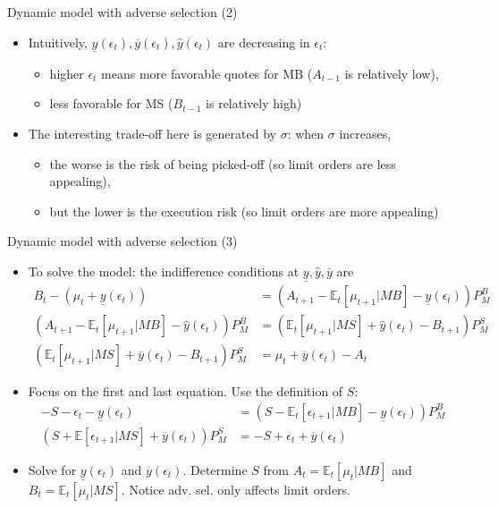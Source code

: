 \documentclass[english,10pt
,aspectratio=169
]{beamer}
\begin{document}
\begin{frame}{Dynamic model with adverse selection (2)}
	\begin{itemize}
		\item Intuitively, $\underline{y}(\epsilon_t),\overline{y}(\epsilon_t),\hat{y}(\epsilon_t)$ are decreasing in $\epsilon_t$:
		\begin{itemize}
			\item higher $\epsilon_t$ means more favorable quotes for MB ($A_{t-1}$ is relatively low), 
			\item less favorable for MS ($B_{t-1}$ is relatively high)
		\end{itemize}
		\item The interesting trade-off here is generated by $\sigma$: when $\sigma$ increases,
		\begin{itemize}
			\item the worse is the risk of being picked-off (so limit orders are less appealing),
			\item but the lower is the execution risk (so limit orders are more appealing)
		\end{itemize}
	\end{itemize}
\end{frame}


\begin{frame}{Dynamic model with adverse selection (3)}
	\begin{itemize}
		\item To solve the model: the indifference conditions at $\underline{y},\hat{y},\bar{y}$ are
		\begin{align*}
		B_t-(\mu_t+\underline{y}(\epsilon_t)) 					& = (A_{t+1}-\mathbb{E}_t[\mu_{t+1}|MB]-\underline{y}(\epsilon_t) 	)P^B_M \\
		(A_{t+1}-\mathbb{E}_t[\mu_{t+1}|MB]-\hat{y}(\epsilon_t))P^B_M 			& = (\mathbb{E}_t[\mu_{t+1}|MS]+\hat{y}(\epsilon_t)-B_{t+1})P^S_M  \\
		(\mathbb{E}_t[\mu_{t+1}|MS]+\overline{y}(\epsilon_t)-B_{t+1}) P^S_M  	& = \mu_t+\overline{y}(\epsilon_t)-A_t 
		\end{align*}
		\item Focus on the first and last equation. Use the definition of $S$:
		\begin{align*}
		-S-\epsilon_t-\underline{y}(\epsilon_t) 					& = (S-\mathbb{E}_t[\epsilon_{t+1}|MB]-\underline{y}(\epsilon_t) 	)P^B_M \\
		(S+\mathbb{E}[\epsilon_{t+1}|MS]+\overline{y}(\epsilon_t)) P^S_M  	& =-S+\epsilon_t+\overline{y}(\epsilon_t)
		\end{align*}
		\item Solve for $\underline{y}(\epsilon_t)$ and $\overline{y}(\epsilon_t)$. Determine $S$ from $A_t=\mathbb{E}_t[\mu_t|MB]$ and $B_t= \mathbb{E}_t[\mu_t|MS]$. Notice adv. sel. only affects limit orders. \hyperlink{parlourmain}{}
	\end{itemize}
\end{frame}
\end{document}
